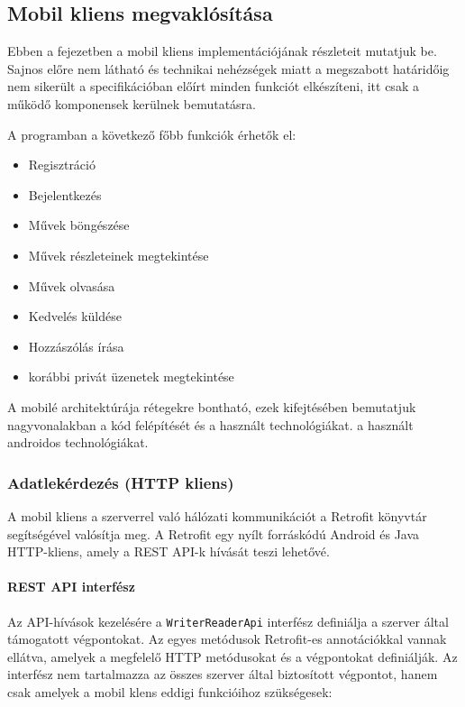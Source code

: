 \subsection{Mobil kliens megvaklósítása}
Ebben a fejezetben a mobil kliens implementációjának részleteit mutatjuk be. Sajnos előre nem látható és
technikai nehézségek miatt a megszabott határidőig nem sikerült a specifikációban előírt minden funkciót elkészíteni, 
itt csak a működő komponensek kerülnek bemutatásra.

A programban a következő főbb funkciók érhetők el: 
\begin{itemize}
    \item Regisztráció
    \item Bejelentkezés
    \item Művek böngészése
    \item Művek részleteinek megtekintése
    \item Művek olvasása
    \item Kedvelés küldése
    \item Hozzászólás írása
    \item korábbi privát üzenetek megtekintése
\end{itemize}

A mobilé architektúrája rétegekre bontható, ezek kifejtésében bemutatjuk nagyvonalakban a kód felépítését és a használt technológiákat.
 a használt androidos technológiákat.


\subsubsection{Adatlekérdezés (HTTP kliens)}
A mobil kliens a szerverrel való hálózati kommunikációt a Retrofit könyvtár segítségével valósítja meg.
A Retrofit egy nyílt forráskódú Android és Java HTTP-kliens, amely a REST API-k hívását teszi lehetővé.


\paragraph{REST API interfész}
Az API-hívások kezelésére a \texttt{WriterReaderApi} interfész definiálja a szerver által támogatott végpontokat. 
Az egyes metódusok Retrofit-es annotációkkal vannak ellátva, amelyek a megfelelő HTTP metódusokat és a végpontokat definiálják.
Az interfész nem tartalmazza az összes szerver által biztosított végpontot, hanem csak amelyek a mobil klens eddigi 
funkcióihoz szükségesek:


